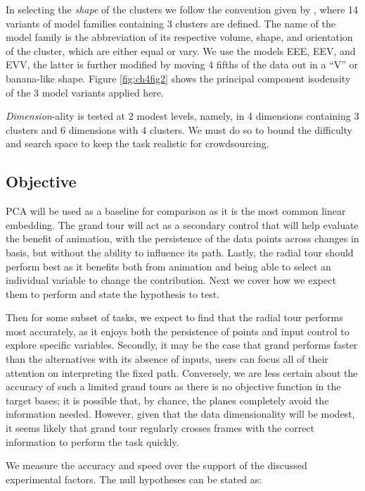 \documentclass{monashthesis}
\begin{document}
In selecting the \emph{shape} of the clusters we follow the convention given by \textcite{scrucca_mclust_2016}, where 14 variants of model families containing 3 clusters are defined. The name of the model family is the abbreviation of its respective volume, shape, and orientation of the cluster, which are either equal or vary. We use the models EEE, EEV, and EVV, the latter is further modified by moving 4 fifths of the data out in a ``V'' or banana-like shape. Figure \ref{fig:ch4fig2} shows the principal component isodensity of the 3 model variants applied here.

\emph{Dimension}-ality is tested at 2 modest levels, namely, in 4 dimensions containing 3 clusters and 6 dimensions with 4 clusters. We must do so to bound the difficulty and search space to keep the task realistic for crowdsourcing.

\hypertarget{sec:objective}{%
\subsection{Objective}\label{sec:objective}}

PCA will be used as a baseline for comparison as it is the most common linear embedding. The grand tour will act as a secondary control that will help evaluate the benefit of animation, with the persistence of the data points across changes in basis, but without the ability to influence its path. Lastly, the radial tour should perform best as it benefits both from animation and being able to select an individual variable to change the contribution. Next we cover how we expect them to perform and state the hypothesis to test.

Then for some subset of tasks, we expect to find that the radial tour performs most accurately, as it enjoys both the persistence of points and input control to explore specific variables. Secondly, it may be the case that grand performs faster than the alternatives with its absence of inputs, users can focus all of their attention on interpreting the fixed path. Conversely, we are less certain about the accuracy of such a limited grand tours as there is no objective function in the target bases; it is possible that, by chance, the planes completely avoid the information needed. However, given that the data dimensionality will be modest, it seems likely that grand tour regularly crosses frames with the correct information to perform the task quickly.

We measure the accuracy and speed over the support of the discussed experimental factors. The null hypotheses can be stated as:
\end{document}
